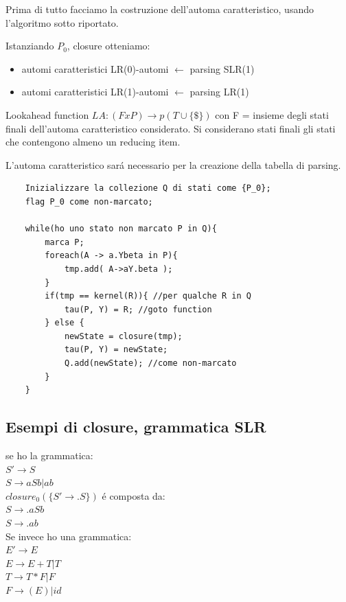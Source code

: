 Prima di tutto facciamo la costruzione dell'automa caratteristico, usando l'algoritmo sotto riportato.

Istanziando $P_0$, closure otteniamo:
\begin{itemize}
	\item automi caratteristici LR(0)-automi $\leftarrow$ parsing SLR(1)\\
	\item automi caratteristici LR(1)-automi $\leftarrow$ parsing LR(1)\\
\end{itemize}
Lookahead function $LA:(FxP) \rightarrow p(T \cup \{ \$ \} )$
con F = insieme degli stati finali dell'automa caratteristico considerato. Si considerano stati finali gli stati che contengono almeno un reducing item.

L'automa caratteristico sar\'a necessario per la creazione della tabella di parsing.

\begin{lstlisting}
	Inizializzare la collezione Q di stati come {P_0};
	flag P_0 come non-marcato;

	while(ho uno stato non marcato P in Q){
		marca P;
		foreach(A -> a.Ybeta in P){
			tmp.add( A->aY.beta );
		}
		if(tmp == kernel(R)){ //per qualche R in Q
			tau(P, Y) = R; //goto function
		} else {
			newState = closure(tmp);
			tau(P, Y) = newState;
			Q.add(newState); //come non-marcato 
		}
	}
\end{lstlisting}

\subsection{Esempi di closure, grammatica SLR}
se ho la grammatica:\\
$S' \rightarrow S$\\
$S \rightarrow aSb|ab$\\
$closure_0(\{ S' \rightarrow .S\})$ \'e composta da:\\
$S \rightarrow .aSb$\\
$S \rightarrow .ab$\\

Se invece ho una grammatica:\\ 
$E' \rightarrow E$\\
$E \rightarrow E + T | T$\\
$T \rightarrow T * F | F$\\
$F \rightarrow (E) | id $\\

